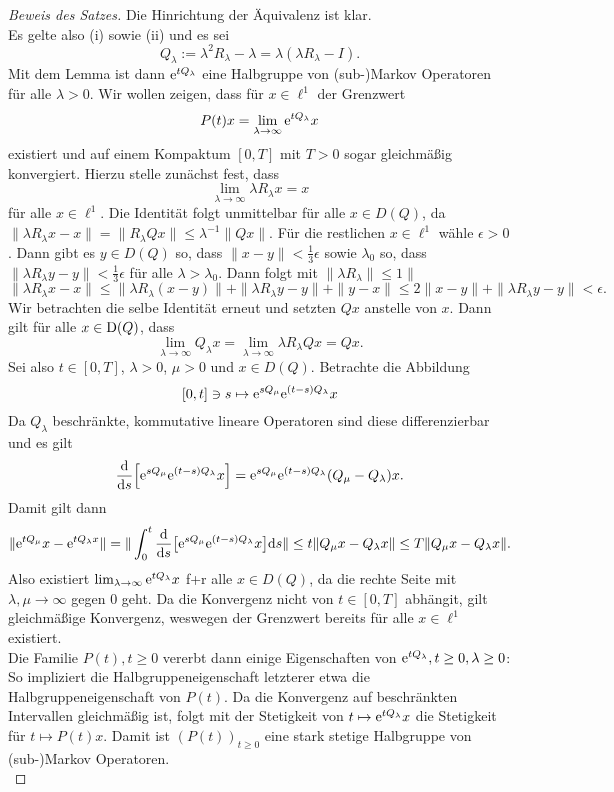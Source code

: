 \documentclass[a4paper]{paper}
\numberwithin{equation}{satz}
\begin{document}
\begin{proof}[Beweis des Satzes] Die Hinrichtung der Äquivalenz ist klar. \\Es gelte also (i) sowie (ii) und es sei 
$$Q_\lambda:=\lambda^2 R_\lambda -\lambda=\lambda(\lambda R_\lambda -I).$$
Mit dem Lemma ist dann $\text e^{t Q_\lambda}$ eine Halbgruppe von (sub-)Markov Operatoren für alle $\lambda>0$. Wir wollen zeigen, dass für $x\in\ell^1$ der Grenzwert $$P(t)x=\lim_{\lambda\to\infty}\text e^{tQ_\lambda}x$$ existiert und auf einem Kompaktum $[0,T]$ mit $T>0$ sogar gleichmäßig konvergiert. Hierzu stelle zunächst fest, dass $$\lim_{\lambda\to\infty}\lambda R_\lambda x=x$$ für alle $x\in\ell^1$. Die Identität folgt unmittelbar für alle $x\in D(Q)$, da  $\|\lambda R_\lambda x-x\|=\|R_\lambda Qx\|\leq \lambda^{-1}\|Qx\|$. Für die restlichen $x\in\ell^1$  wähle $\epsilon >0$. Dann gibt es $y\in  D(Q)$ so, dass $\|x-y\|<\frac{1}{3}\epsilon$ sowie $\lambda_0$ so, dass $\|\lambda R_\lambda y-y\|< \frac{1}{3}\epsilon$ für alle $\lambda > \lambda_0$. Dann folgt mit $\|\lambda R_\lambda\|\leq 1\|$$$\|\lambda R_\lambda x-x\|\leq\|\lambda R_\lambda(x-y)\|+\|\lambda R_\lambda y-y\|+\|y-x\|\leq 2\|  x-y\|+\|\lambda R_\lambda y-y\|<\epsilon.$$ Wir betrachten die selbe Identität erneut und setzten $Qx$ anstelle von $x$. Dann gilt für alle $x\in\operatorname{D}(Q)$, dass $$\lim_{\lambda\to\infty}Q_\lambda x=\lim_{\lambda\to\infty}\lambda R_\lambda Qx= Qx.$$  
Sei also $t\in[0,T]$, $\lambda >0$, $\mu>0$ und $x\in D(Q)$. Betrachte die Abbildung $$[0,t]\ni s\mapsto \text e^{sQ_\mu}\text e^{(t-s)Q_\lambda}x$$ Da $Q_\lambda$ beschränkte, kommutative lineare Operatoren sind diese differenzierbar und es gilt $$\frac{\text d}{\text ds}\Big[\text e^{sQ_\mu}\text e^{(t-s)Q_\lambda}x\Big]=\text e^{s Q_\mu}\text e^{(t-s)Q_\lambda}(Q_\mu- Q_\lambda)x.$$ Damit gilt dann $$\|\text e^{tQ_\mu}x -\text e^{tQ_\lambda x}\|=\|\int_0^t\frac{\text d}{\text ds}\big[\text e^{sQ_\mu}\text e^{(t-s)Q_\lambda} x\big]\text ds\|\leq t\|Q_\mu x- Q_\lambda x\|\leq T\|Q_\mu x- Q_\lambda x\|.$$ Also existiert $\lim_{\lambda\to\infty} \text e^{t Q_\lambda} x$ f+r alle $x\in D(Q)$, da die rechte Seite mit $\lambda, \mu\to\infty$ gegen $0$ geht.  Da die Konvergenz nicht von $t\in[0,T]$ abhängit, gilt gleichmäßige Konvergenz, weswegen der Grenzwert bereits für alle $x\in\ell^1$ existiert. \\
Die Familie $P(t),t\geq0$ vererbt dann einige Eigenschaften von $\text e^{t Q_\lambda}, t\geq0, \lambda \geq0$: So impliziert die Halbgruppeneigenschaft letzterer etwa die Halbgruppeneigenschaft von $P(t)$. Da die Konvergenz auf beschränkten Intervallen gleichmäßig ist, folgt mit der Stetigkeit von $t\mapsto\text e^{t Q_\lambda}x$ die Stetigkeit für $t\mapsto P(t)x$. Damit ist $(P(t))_{t\geq0}$ eine stark stetige Halbgruppe von (sub-)Markov Operatoren.\\

\end{proof}
\end{document}
